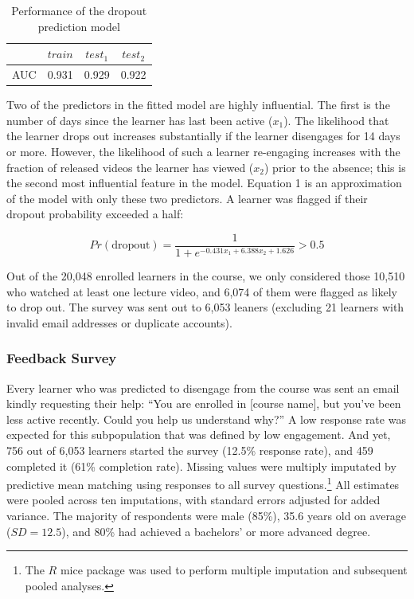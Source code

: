 \documentclass{sigchi}\usepackage[]{graphicx}\usepackage[]{color}
\begin{document}
\begin{table}[h!]
\caption{Performance of the dropout prediction model}
\label{tab:drop_pred_rocs}
\small
\center
\begin{tabular}{lccc}
\toprule
 & $train$ & $test_1$ & $test_2$ \\
\midrule
AUC &  0.931 & 0.929 & 0.922  \\
\bottomrule
\end{tabular}
\end{table}

Two of the predictors in the fitted model are highly influential. The first is the number of days since the learner has last been active ($x_{1}$). The likelihood that the learner drops out increases substantially if the learner disengages for 14 days or more. However, the likelihood of such a learner re-engaging increases with the fraction of released videos the learner has viewed ($x_{2}$) prior to the absence; this is the second most influential feature in the model. Equation 1 is an approximation of the model with only these two predictors. A learner was flagged if their dropout probability exceeded a half:

\begin{equation}
Pr(\text{dropout}) = \frac{1}{1+e^{-0.431x_1 + 6.388x_2 + 1.626}} > 0.5
\end{equation}

Out of the 20,048 enrolled learners in the course, we only considered those 10,510 who watched at least one lecture video, and 6,074 of them were flagged as likely to drop out. The survey was sent out to 6,053 leaners (excluding 21 learners with invalid email addresses or duplicate accounts).


\subsubsection{Feedback Survey}

Every learner who was predicted to disengage from the course was sent an email kindly requesting their help: ``You are enrolled in [course name], but you've been less active recently. Could you help us understand why?'' A low response rate was expected for this subpopulation that was defined by low engagement. And yet, 756 out of 6,053 learners started the survey (12.5\% response rate), and 459 completed it (61\% completion rate). Missing values were multiply imputated by predictive mean matching using responses to all survey questions.\footnote{The $R$ mice package was used to perform multiple imputation and subsequent pooled analyses.} All estimates were pooled across ten imputations, with standard errors adjusted for added variance. The majority of respondents were male (85\%), 35.6 years old on average ($SD=12.5$), and 80\% had achieved a bachelors' or more advanced degree.
\end{document}
